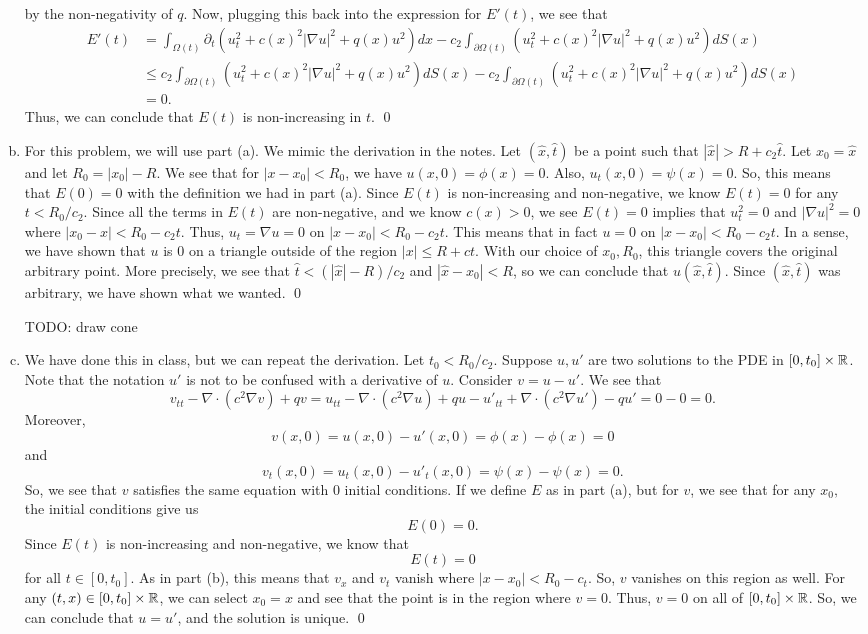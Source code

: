 \documentclass{article}
\newcommand{\D}{\nabla}
\renewcommand{\d}{\partial}
\begin{document}
\begin{enumerate}[(a)]
    by the non-negativity of $q$. Now, plugging this back into the expression for $E'(t)$, we see that 
    \begin{align*}
        E'(t) &= \int_{\Omega(t)}\d_t(u_t^2 + c(x)^2|\D u |^2 + q(x)u^2) dx   -c_2\int_{\d\Omega(t)}(u_t^2 + c(x)^2|\D u |^2 + q(x)u^2) dS(x) \\
        &\le c_2\int_{\d\Omega(t)}(u_t^2 + c(x)^2|\D u |^2 + q(x)u^2) dS(x)-c_2\int_{\d\Omega(t)}(u_t^2 + c(x)^2|\D u |^2 + q(x)u^2) dS(x)\\
        &=  0.
    \end{align*}
    Thus, we can conclude that $E(t)$ is non-increasing in $t$. \qed
    \item For this problem, we will use part (a). We mimic the derivation in the notes. 
    \hop 
    Let $(\hat{x},\hat{t})$ be a point such that $|\hat{x}| > R+c_2\hat{t}$. Let $x_0 = \hat{x}$ and let $R_0 = |x_0| - R$. We see that for $|x-x_0| < R_0$, we have $u(x,0) = \phi(x) = 0$. Also, $u_t(x,0) = \psi(x)  = 0$. So, this means that $E(0) = 0$ with the definition we had in part (a). 
    \hop 
    Since $E(t)$ is non-increasing and non-negative, we know $E(t) = 0$ for any $t < R_0/c_2$. Since all the terms in $E(t)$ are non-negative, and we know $c(x) >0$, we see $E(t) = 0$ implies that $u_t^2 = 0$ and $|\D u|^2 = 0$ where $|x_0 -x| < R_0 - c_2t$. Thus, $u_t =  \D u = 0$ on $|x -x_0| < R_0 - c_2t$. This means that in fact $u = 0$ on $|x -x_0| < R_0 - c_2t$. 
    \hop 
    In a sense, we have shown that $u$ is 0 on a triangle outside of the region $|x| \le R + ct$. With our choice of $x_0, R_0$, this triangle covers the original arbitrary point. 
    \hop 
    More precisely, we see that $\hat{t} < (|\hat{x}| - R)/c_2$ and $|\hat{x} -x_0| < R$, so we can conclude that $u(\hat{x}, \hat{t})$. Since $(\hat{x},\hat{t})$ was arbitrary, we have shown what we wanted. \qed 

    TODO: draw cone 

    \item We have done this in class, but we can repeat the derivation. Let $t_0 < R_0/c_2$. Suppose $u, u'$ are two solutions to the PDE in $[0, t_0] \times \mathbb{R}$. Note that the notation $u'$ is not to be confused with a derivative of $u$. Consider $v=u -u'$. We see that 
    \[v_{tt} - \D \cdot (c^2 \D v) +qv =  u_{tt} - \D \cdot (c^2 \D u) +qu - u'_{tt} + \D \cdot (c^2 \D u') -qu' = 0 - 0 = 0.\]
    Moreover, 
    \[v(x,0) = u(x,0) - u'(x,0)= \phi(x)- \phi(x)=0\]
    and 
    \[v_t(x,0) = u_t(x,0) - u'_t(x,0)= \psi(x)- \psi(x)=0.\]
    So, we see that $v$ satisfies the same equation with 0 initial conditions. If we define $E$ as in part (a), but for $v$, we see that for any $x_0,$ the initial conditions give us 
    \[E(0) = 0.\]
    Since $E(t)$ is non-increasing and non-negative, we know that 
    \[E(t) = 0\]
    for all $t \in [0,t_0]$. As in part (b), this means that $v_x$ and $v_t$ vanish where $|x - x_0| < R_0-c_t$. So, $v$ vanishes on this region as well. For any $(t,x) \in [0,t_0] \times \mathbb{R}$, we can select $x_0 = x$ and see that the point is in the region where $v =0$. Thus,  $v = 0$ on all of $[0,t_0] \times \mathbb{R}$. 
    \hop 
    So, we can conclude that $u = u'$, and the solution is unique. \qed

\end{enumerate}
\end{document}
